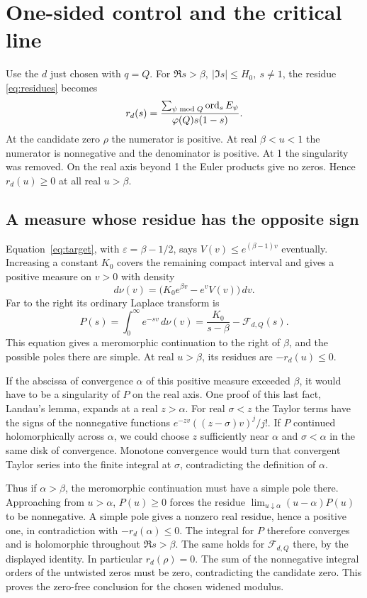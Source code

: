 \section{One-sided control and the critical line}\label{sec:landau}
Use the \(d\) just chosen with \(q=Q\). For \(\Re s>\beta,\ |\Im s|\le H_0,\ s\ne1\), the residue \eqref{eq:residues} becomes
\[
       r_d(s)=\frac{\sum_{\psi\bmod Q}\operatorname{ord}_s E_\psi}
                    {\varphi(Q)s(1-s)} .
\]
At the candidate zero \(\rho\) the numerator is positive. At real \(\beta<u<1\) the numerator is nonnegative and the denominator is positive. At 1 the singularity was removed. On the real axis beyond 1 the Euler products give no zeros. Hence \(r_d(u)\ge0\) at all real \(u>\beta\).

\subsection{A measure whose residue has the opposite sign}
Equation~\eqref{eq:target}, with \(\varepsilon=\beta-1/2\), says \(V(v)\le e^{(\beta-1)v}\) eventually. Increasing a constant \(K_0\) covers the remaining compact interval and gives a positive measure on \(v>0\) with density
\[
    d\nu(v)=\bigl(K_0e^{\beta v}-e^v V(v)\bigr)\,dv.
\]
Far to the right its ordinary Laplace transform is
\[
        P(s)=\int_0^\infty e^{-sv}\,d\nu(v)
                =\frac{K_0}{s-\beta}-\mathcal F_{d,Q}(s).
\]
This equation gives a meromorphic continuation to the right of \(\beta\), and the possible poles there are simple. At real \(u>\beta\), its residues are \(-r_d(u)\le0\).

If the abscissa of convergence \(\alpha\) of this positive measure exceeded \(\beta\), it would have to be a singularity of \(P\) on the real axis. One proof of this last fact, Landau's lemma, expands at a real \(z>\alpha\). For real \(\sigma<z\) the Taylor terms have the signs of the nonnegative functions \(e^{-zv}((z-\sigma)v)^j/j!\). If \(P\) continued holomorphically across \(\alpha\), we could choose \(z\) sufficiently near \(\alpha\) and \(\sigma<\alpha\) in the same disk of convergence. Monotone convergence would turn that convergent Taylor series into the finite integral at \(\sigma\), contradicting the definition of \(\alpha\).

Thus if \(\alpha>\beta\), the meromorphic continuation must have a simple pole there. Approaching from \(u>\alpha\), \(P(u)\ge0\) forces the residue \(\lim_{u\downarrow\alpha}(u-\alpha)P(u)\) to be nonnegative. A simple pole gives a nonzero real residue, hence a positive one, in contradiction with \(-r_d(\alpha)\le0\). The integral for \(P\) therefore converges and is holomorphic throughout \(\Re s>\beta\). The same holds for \(\mathcal F_{d,Q}\) there, by the displayed identity. In particular \(r_d(\rho)=0\). The sum of the nonnegative integral orders of the untwisted zeros must be zero, contradicting the candidate zero. This proves the zero-free conclusion for the chosen widened modulus.

